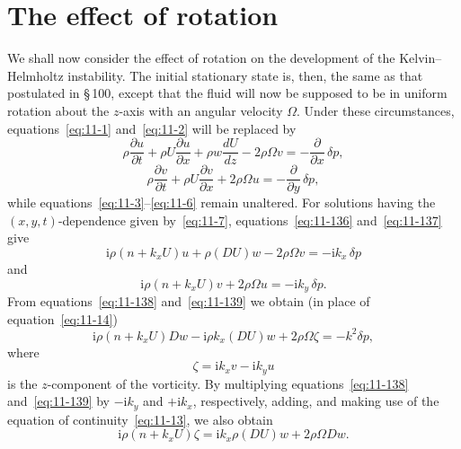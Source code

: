 \section{The effect of rotation}\label{sec:105}

We shall now consider the effect of rotation on the development of the Kelvin--Helmholtz instability. The initial stationary state is, then, the same as that postulated in \S\,100, except that the fluid will now be supposed to be in uniform rotation about the $z$-axis with an angular velocity $\Omega$. Under these circumstances, equations~\eqref{eq:11-1} and~\eqref{eq:11-2} will be replaced by
\begin{equation}
\label{eq:11-136}
\rho\frac{\partial u}{\partial t}+\rho U\frac{\partial u}{\partial x}+\rho w\frac{dU}{dz}-2\rho\Omega v = -\frac{\partial}{\partial x}\,\delta p,
\end{equation}
\begin{equation}
\label{eq:11-137}
\rho\frac{\partial v}{\partial t}+\rho U\frac{\partial v}{\partial x}+2\rho\Omega u = -\frac{\partial}{\partial y}\,\delta p,
\end{equation}
while equations~\eqref{eq:11-3}--\eqref{eq:11-6} remain unaltered. For solutions having the $(x,y,t)$-dependence given by~\eqref{eq:11-7}, equations~\eqref{eq:11-136} and~\eqref{eq:11-137} give
\begin{equation}
\label{eq:11-138}
\mathrm{i}\rho(n+k_x U)u+\rho(DU)w-2\rho\Omega v = -\mathrm{i}k_x\,\delta p
\end{equation}
and
\begin{equation}
\label{eq:11-139}
\mathrm{i}\rho(n+k_x U)v+2\rho\Omega u = -\mathrm{i}k_y\,\delta p.
\end{equation}
From equations~\eqref{eq:11-138} and~\eqref{eq:11-139} we obtain (in place of equation~\eqref{eq:11-14})
\begin{equation}
\label{eq:11-140}
\mathrm{i}\rho(n+k_x U)Dw - \mathrm{i}\rho k_x(DU)w + 2\rho\Omega\zeta = -k^2\delta p,
\end{equation}
where
\begin{equation}
\label{eq:11-141}
\zeta = \mathrm{i}k_x v - \mathrm{i}k_y u
\end{equation}
is the $z$-component of the vorticity. By multiplying equations~\eqref{eq:11-138} and~\eqref{eq:11-139} by $-\mathrm{i}k_y$ and $+\mathrm{i}k_x$, respectively, adding, and making use of the equation of continuity~\eqref{eq:11-13}, we also obtain
\begin{equation}
\label{eq:11-142}
\mathrm{i}\rho(n+k_x U)\zeta = \mathrm{i}k_x\rho(DU)w + 2\rho\Omega Dw.
\end{equation}

